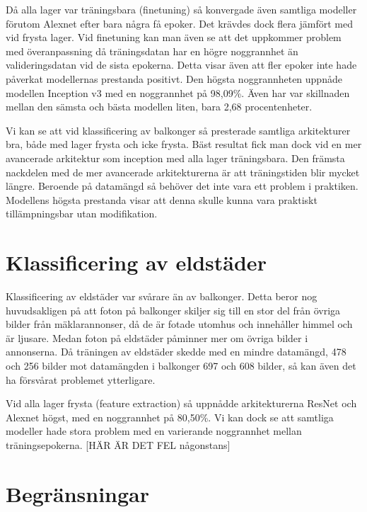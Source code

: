 \documentclass[]{kththesis}
\begin{document}
Då alla lager var träningsbara (finetuning) så konvergade även samtliga modeller förutom Alexnet efter bara några få epoker. Det krävdes dock flera jämfört med vid frysta lager. Vid finetuning kan man även se att det uppkommer problem med överanpassning då träningsdatan har en högre noggrannhet än valideringsdatan vid de sista epokerna. Detta visar även att fler epoker inte hade påverkat modellernas prestanda positivt. Den högsta noggrannheten uppnåde modellen Inception v3 med en noggrannhet på 98,09\%. Även har var skillnaden mellan den sämsta och bästa modellen liten, bara 2,68 procentenheter.

Vi kan se att vid klassificering av balkonger så presterade samtliga arkitekturer bra, både med lager frysta och icke frysta. Bäst resultat fick man dock vid en mer avancerade arkitektur som inception med alla lager träningsbara. Den främsta nackdelen med de mer avancerade arkitekturerna är att träningstiden blir mycket längre. Beroende på datamängd så behöver det inte vara ett problem i praktiken. Modellens högsta prestanda visar att denna skulle kunna vara praktiskt tillämpningsbar utan modifikation.

\section{Klassificering av eldstäder}


Klassificering av eldstäder var svårare än av balkonger. Detta beror nog huvudsakligen på att foton på balkonger skiljer sig till en stor del från övriga bilder från mäklarannonser, då de är fotade utomhus och innehåller himmel och är ljusare. Medan foton på eldstäder påminner mer om övriga bilder i annonserna. Då träningen av eldstäder skedde med en mindre datamängd, 478 och 256 bilder mot datamängden i balkonger 697 och 608 bilder, så kan även det ha försvårat problemet ytterligare. 

Vid alla lager frysta (feature extraction) så uppnådde arkitekturerna ResNet och Alexnet högst, med en noggrannhet på 80,50\%. Vi kan dock se att samtliga modeller hade stora problem med en varierande noggrannhet mellan träningsepokerna. [HÄR ÄR DET FEL någonstans]

\section{Begränsningar}
\end{document}

